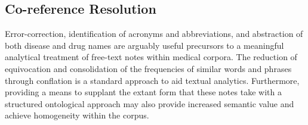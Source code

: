 




\subsection{Co-reference Resolution}
\label{section-rr-coreference-resolution}
  
Error-correction, identification of acronyms and abbreviations, and abstraction of both disease and drug names are arguably useful precursors to a meaningful analytical treatment of free-text notes within medical corpora. The reduction of equivocation and consolidation of the frequencies of similar words and phrases through conflation is a standard approach to aid textual analytics. Furthermore, providing a means to supplant the extant form that these notes take with a structured ontological approach may also provide increased semantic value and achieve homogeneity within the corpus.


